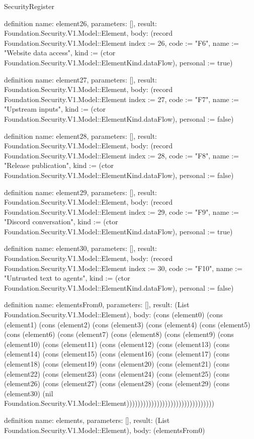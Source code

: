 \begin{lexlean}{SecurityRegister}
\begin{semanticmodule}
definition{
  name: element26,
  parameters: [],
  result: Foundation.Security.V1.Model::Element,
  body: (record Foundation.Security.V1.Model::Element {index := 26, code := "F6", name := "Website data access", kind := (ctor Foundation.Security.V1.Model::ElementKind.dataFlow), personal := true})
}

definition{
  name: element27,
  parameters: [],
  result: Foundation.Security.V1.Model::Element,
  body: (record Foundation.Security.V1.Model::Element {index := 27, code := "F7", name := "Upstream inputs", kind := (ctor Foundation.Security.V1.Model::ElementKind.dataFlow), personal := false})
}

definition{
  name: element28,
  parameters: [],
  result: Foundation.Security.V1.Model::Element,
  body: (record Foundation.Security.V1.Model::Element {index := 28, code := "F8", name := "Release publication", kind := (ctor Foundation.Security.V1.Model::ElementKind.dataFlow), personal := false})
}

definition{
  name: element29,
  parameters: [],
  result: Foundation.Security.V1.Model::Element,
  body: (record Foundation.Security.V1.Model::Element {index := 29, code := "F9", name := "Discord conversation", kind := (ctor Foundation.Security.V1.Model::ElementKind.dataFlow), personal := true})
}

definition{
  name: element30,
  parameters: [],
  result: Foundation.Security.V1.Model::Element,
  body: (record Foundation.Security.V1.Model::Element {index := 30, code := "F10", name := "Untrusted text to agents", kind := (ctor Foundation.Security.V1.Model::ElementKind.dataFlow), personal := false})
}

definition{
  name: elementsFrom0,
  parameters: [],
  result: (List Foundation.Security.V1.Model::Element),
  body: (cons (element0) (cons (element1) (cons (element2) (cons (element3) (cons (element4) (cons (element5) (cons (element6) (cons (element7) (cons (element8) (cons (element9) (cons (element10) (cons (element11) (cons (element12) (cons (element13) (cons (element14) (cons (element15) (cons (element16) (cons (element17) (cons (element18) (cons (element19) (cons (element20) (cons (element21) (cons (element22) (cons (element23) (cons (element24) (cons (element25) (cons (element26) (cons (element27) (cons (element28) (cons (element29) (cons (element30) (nil Foundation.Security.V1.Model::Element))))))))))))))))))))))))))))))))
}

definition{
  name: elements,
  parameters: [],
  result: (List Foundation.Security.V1.Model::Element),
  body: (elementsFrom0)
}


\end{semanticmodule}
\end{lexlean}
